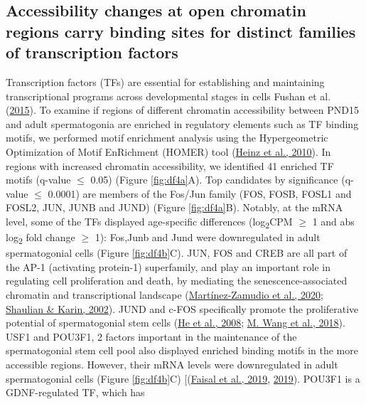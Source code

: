 \documentclass[12pt,twoside]{reedthesis}
\begin{document}
\hypertarget{accessibility-changes-at-open-chromatin-regions-carry-binding-sites-for-distinct-families-of-transcription-factors}{%
\subsection{Accessibility changes at open chromatin regions carry binding sites for distinct families of transcription factors}\label{accessibility-changes-at-open-chromatin-regions-carry-binding-sites-for-distinct-families-of-transcription-factors}}

Transcription factors (TFs) are essential for establishing and
maintaining transcriptional programs across developmental stages in
cells Fushan et al. (\protect\hyperlink{ref-fushan2015}{2015}). To examine if regions of different
chromatin accessibility between PND15 and adult spermatogonia are
enriched in regulatory elements such as TF binding motifs, we performed
motif enrichment analysis using the Hypergeometric Optimization of Motif
EnRichment (HOMER) tool (\protect\hyperlink{ref-heinz2010}{Heinz et al., 2010}). In regions with increased
chromatin accessibility, we identified 41 enriched TF motifs (q-value
\(\leq\) 0.05) (Figure \ref{fig:df4a}A). Top candidates by significance (q-value \(\leq\)
0.0001) are members of the Fos/Jun family (FOS, FOSB, FOSL1 and FOSL2,
JUN, JUNB and JUND) (Figure \ref{fig:df4a}B). Notably, at the mRNA level, some of the
TFs displayed age-specific differences (log\textsubscript{2}CPM \(\geq\) 1 and abs log\textsubscript{2}
fold change \(\geq\) 1): Fos,Junb and Jund were downregulated in adult
spermatogonial cells (Figure \ref{fig:df4b}C). JUN, FOS and CREB are all part of the
AP-1 (activating protein-1) superfamily, and play an important role in
regulating cell proliferation and death, by mediating the
senescence-associated chromatin and transcriptional landscape
(\protect\hyperlink{ref-martuxednez-zamudio2020}{Martínez-Zamudio et al., 2020}; \protect\hyperlink{ref-shaulian2002}{Shaulian \& Karin, 2002}). JUND and c-FOS specifically
promote the proliferative potential of spermatogonial stem cells
(\protect\hyperlink{ref-he2008}{He et al., 2008}; \protect\hyperlink{ref-wang2018}{M. Wang et al., 2018}). USF1 and POU3F1, 2 factors important in the
maintenance of the spermatogonial stem cell pool also displayed enriched
binding motifs in the more accessible regions. However, their mRNA
levels were downregulated in adult spermatogonial cells (Figure \ref{fig:df4b}C)
{[}(\protect\hyperlink{ref-faisal2019}{Faisal et al., 2019}, \protect\hyperlink{ref-faisal2019}{2019}). POU3F1 is a GDNF-regulated TF, which has
\end{document}
